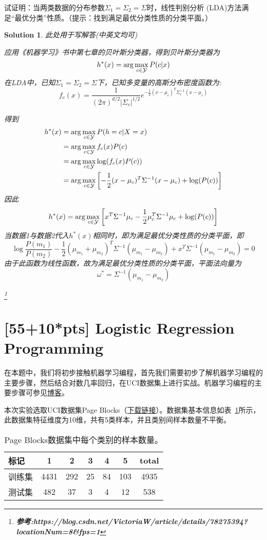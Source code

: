 \documentclass[a4paper,UTF8]{article}
\numberwithin{equation}{section}
\newtheorem*{solution}{Solution}
\begin{document}
试证明：当两类数据的分布参数$\Sigma_1=\Sigma_2=\Sigma$时，线性判别分析 (LDA)方法满足“最优分类”性质。（提示：找到满足最优分类性质的分类平面。）
\begin{solution}
	此处用于写解答(中英文均可)
	
	应用《机器学习》书中第七章的贝叶斯分类器，得到贝叶斯分类器为
	$$h^*(x)=\arg \max_{c\in{\cal Y}}P(c|x)$$
	在LDA中，已知$\Sigma_1=\Sigma_2=\Sigma$下，已知多变量的高斯分布密度函数为:
	$$f_c(x)=\frac{1}{(2\pi)^{d/2}|\Sigma_c|^{1/2}}e^{-\frac{1}{2}(x-\mu_c)^T\Sigma_{c}^{-1}(x-\mu_c)}$$
	
	得到
	\begin{align*}  h^*(x)
	& = \arg \max_{c\in{\cal Y}} P(h=c|X=x) \\
	& = \arg \max_{c\in{\cal Y}} f_c(x)P(c) \\
	& = \arg \max_{c\in{\cal Y}} \log(f_c(x)P(c)) \\
	& = \arg \max_{c\in{\cal Y}} \left[-\frac{1}{2}(x-\mu_c)^T\Sigma^{-1}(x-\mu_c)+\log(P(c))  \right]
	\end{align*}
	因此
	$${h}^*(x)= \arg \max_{c\in{\cal Y}}\left[x^T\Sigma^{-1}\mu_c-\frac{1}{2}\mu_{c}^{T}\Sigma^{-1}\mu_{c}+\log(P(c))\right]
	$$
	当数据1与数据2代入${h}^*(x)$相同时，即为满足最优分类性质的分类平面，即
	$$\log\frac{P(m_1)}{P(m_2)}-\frac{1}{2}(\mu_{m_1}+\mu_{m_2})^T\Sigma^{-1}(\mu_{m_1}-\mu_{m_2})+x^T\Sigma^{-1}(\mu_{m_1}-\mu_{m_2})=0$$
	由于此函数为线性函数，故为满足最优分类性质的分类平面，平面法向量为
	$$\omega^*=\Sigma^{-1}(\mu_{m_1}-\mu_{m_2})$$
	
	\footnote{\textbf{参考:https://blog.csdn.net/VictoriaW/article/details/78275394?locationNum=8\&fps=1}}
\end{solution}
\newpage



\section{[55+10*pts] Logistic Regression Programming}
在本题中，我们将初步接触机器学习编程，首先我们需要初步了解机器学习编程的主要步骤，然后结合对数几率回归，在UCI数据集上进行实战。机器学习编程的主要步骤可参见\href{http://blog.csdn.net/cqy_chen/article/details/78690975}{博客}。

本次实验选取UCI数据集Page Blocks（\href{http://lamda.nju.edu.cn/ml2018/PS2/PS2_dataset.zip}{下载链接}）。数据集基本信息如表~\ref{data_inf}所示，此数据集特征维度为10维，共有5类样本，并且类别间样本数量不平衡。

\begin{table}[!h]
	\centering
	\caption{Page Blocks数据集中每个类别的样本数量。}\vspace{3mm}
	\label{data_inf}
	\begin{tabular}{l|cccccc}\hline
		标记     & 1    & 2   & 3  & 4  & 5   & total \\ \hline
		训练集   & 4431 & 292 & 25 & 84 & 103 & 4935  \\
		测试集   & 482  & 37  & 3  & 4  & 12  & 538   \\ \hline
	\end{tabular}
\end{table}
\end{document}
